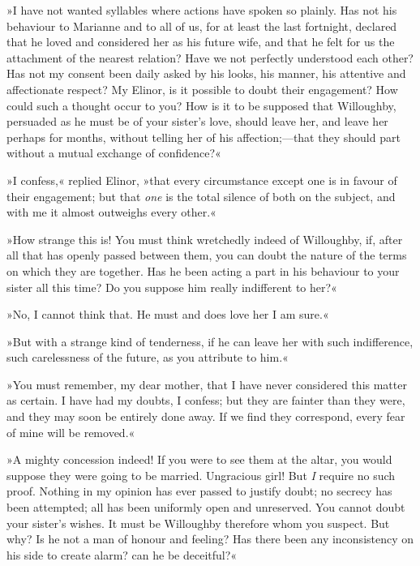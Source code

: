 »I have not wanted syllables where actions have spoken so plainly. Has not his behaviour to Marianne and to all of us, for at least the last fortnight, declared that he loved and considered her as his future wife, and that he felt for us the attachment of the nearest relation? Have we not perfectly understood each other? Has not my consent been daily asked by his looks, his manner, his attentive and affectionate respect? My Elinor, is it possible to doubt their engagement? How could such a thought occur to you? How is it to be supposed that Willoughby, persuaded as he must be of your sister’s love, should leave her, and leave her perhaps for months, without telling her of his affection;—that they should part without a mutual exchange of confidence?«

»I confess,« replied Elinor, »that every circumstance except one is in favour of their engagement; but that \textit{one} is the total silence of both on the subject, and with me it almost outweighs every other.«

»How strange this is! You must think wretchedly indeed of Willoughby, if, after all that has openly passed between them, you can doubt the nature of the terms on which they are together. Has he been acting a part in his behaviour to your sister all this time? Do you suppose him really indifferent to her?«

»No, I cannot think that. He must and does love her I am sure.«

»But with a strange kind of tenderness, if he can leave her with such indifference, such carelessness of the future, as you attribute to him.«

»You must remember, my dear mother, that I have never considered this matter as certain. I have had my doubts, I confess; but they are fainter than they were, and they may soon be entirely done away. If we find they correspond, every fear of mine will be removed.«

»A mighty concession indeed! If you were to see them at the altar, you would suppose they were going to be married. Ungracious girl! But \textit{I} require no such proof. Nothing in my opinion has ever passed to justify doubt; no secrecy has been attempted; all has been uniformly open and unreserved. You cannot doubt your sister’s wishes. It must be Willoughby therefore whom you suspect. But why? Is he not a man of honour and feeling? Has there been any inconsistency on his side to create alarm? can he be deceitful?«

